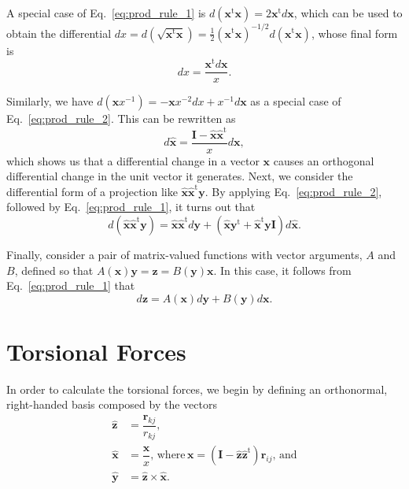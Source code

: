 \documentclass[11pt]{article}
\newcommand{\mt}[1]{\boldsymbol{\mathbf{#1}}}           %
\newcommand{\vt}[1]{\boldsymbol{\mathbf{#1}}}           %
\newcommand{\tr}[1]{#1^\text{t}}                        %
\begin{document}
A special case of Eq.~\ref{eq:prod_rule_1} is $d(\tr{\vt x}{\vt x}) = 2\tr{\vt x}d{\vt x}$, which can be used to obtain the differential $dx = d(\sqrt{\tr{\vt x}{\vt x}}) = \frac{1}{2}(\tr{\vt x}\vt x)^{-1/2}d(\tr{\vt x}\vt x)$, whose final form is
\begin{equation}
\label{eq:norm_rule}
dx = \frac{\tr{\vt x}d{\vt x}}{x}.
\end{equation}

Similarly, we have $d({\vt x}x^{-1}) = -{\vt x}x^{-2}dx + x^{-1}d\vt x$ as a special case of Eq.~\ref{eq:prod_rule_2}. This can be rewritten as
\begin{equation}
\label{eq:unit_vector_rule}
d\hat{\vt x} = \frac{\mt I - \hat{\vt x}\tr{\hat{\vt x}}}{x} d\vt x,
\end{equation}
which shows us that a differential change in a vector $\vt x$ causes an orthogonal differential change in the unit vector it generates. Next, we consider the differential form of a projection like $\hat{\vt x} \tr{\hat{\vt x}} \vt y$. By applying Eq.~\ref{eq:prod_rule_2}, followed by Eq.~\ref{eq:prod_rule_1}, it turns out that
\begin{equation}
\label{eq:projection_rule}
d(\hat{\vt x} \tr{\hat{\vt x}} \vt y) = \hat{\vt x}\tr{\hat{\vt x}} d\vt y + (\hat{\vt x}\tr{\vt y} + \tr{\hat{\vt x}} \vt y \mt I) d\hat{\vt x}.
\end{equation}

Finally, consider a pair of matrix-valued functions with vector arguments, $A$ and $B$, defined so that $A(\vt x)\vt y = \vt z = B(\vt y)\vt x$. In this case, it follows from Eq.~\ref{eq:prod_rule_1} that
\begin{equation}
\label{eq:interchange_rule}
d\vt z = A(\vt x)d\vt y + B(\vt y)d\vt x.
\end{equation}

\section{Torsional Forces}

In order to calculate the torsional forces, we begin by defining an orthonormal, right-handed basis composed by the vectors
\begin{subequations}
\begin{align}
\hat{\vt z} &= \dfrac{{\vt r}_{kj}}{r_{kj}}, \\
\hat{\vt x} &= \dfrac{\vt x}{x}, \, \text{where} \, \vt x = (\mt I - \hat{\vt z}\tr{\hat{\vt z}}){\vt r}_{ij}, \, \text{and} \label{eq:x_definition} \\
\hat{\vt y} &= \hat{\vt z} \times \hat{\vt x}.
\end{align}
\end{subequations}
\end{document}
